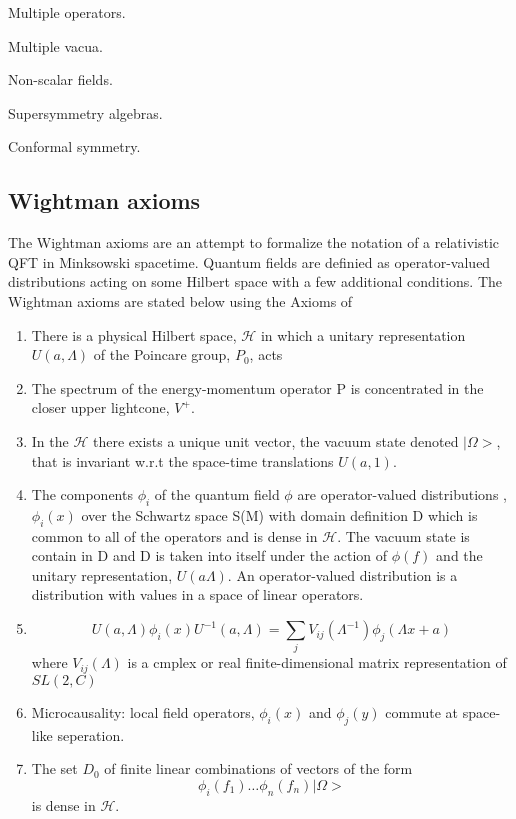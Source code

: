 \documentclass{article}
\begin{document}
Multiple operators.

Multiple vacua.

Non-scalar fields.

Supersymmetry algebras.

Conformal symmetry.

\subsection{Wightman axioms}\label{wightmanaxioms}

The Wightman axioms are an attempt to formalize the notation of a relativistic QFT in Minksowski spacetime. Quantum fields are definied as operator-valued distributions acting on some Hilbert space with a few additional conditions. The Wightman axioms are stated below using the Axioms of \cite{https://ncatlab.org/nlab/show/Wightman+axioms}

\begin{enumerate}
    \item There is a physical Hilbert space, $\mathcal{H}$ in which a unitary representation $U(a, \Lambda)$ of the Poincare group,  $P_0$,  acts
    \item The spectrum of the energy-momentum operator P is concentrated in the closer upper lightcone, $V^+$. 
    \item In the $\mathcal{H}$ there exists a unique unit vector, the vacuum state denoted $|\Omega>$, that is invariant w.r.t the space-time translations $U(a,1)$.
    \item The components $\phi_i$ of the quantum field $ \phi$ are operator-valued distributions , $\phi_i(x)$ over the Schwartz space S(M) with domain definition D which is common to all of the operators and is dense in $\mathcal{H}$. The vacuum state is contain in D and D is taken into itself under the action of $\phi(f)$ and the unitary representation, $U(a\Lambda)$. An operator-valued distribution is a distribution with values in a space of linear operators. 
    \item \begin{equation}
        U(a, \Lambda) \phi_i(x) U^{-1}(a, \Lambda)= \sum_j V_{ij} (\Lambda^{-1}) \phi_j(\Lambda x + a)
    \end{equation}
    where $V_{ij}(\Lambda)$ is a cmplex or real finite-dimensional matrix representation of $SL(2,C)$
    \item Microcausality: local field operators, $\phi_i(x)$ and $\phi_j(y)$ commute at space-like seperation. 
    \item The set $D_0$ of finite linear combinations of vectors of the form 
    \begin{equation}
        \phi_i(f_1) \ldots \phi_n(f_n) |\Omega>
    \end{equation}
    is dense in $\mathcal{H}$. 
\end{enumerate}
\end{document}
